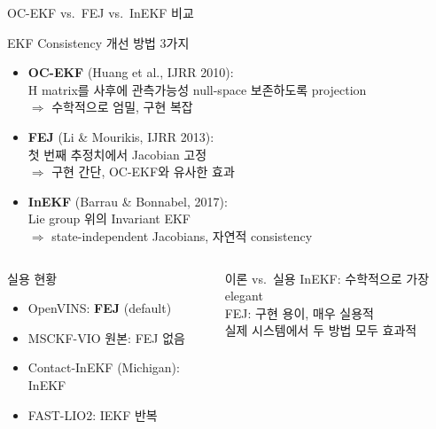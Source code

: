 \begin{frame}[shrink=10]{OC-EKF vs.\ FEJ vs.\ InEKF 비교}
  \begin{block}{EKF Consistency 개선 방법 3가지}
    \begin{itemize}
      \item \textbf{OC-EKF} (Huang et al., IJRR 2010):\\
        H matrix를 사후에 관측가능성 null-space 보존하도록 projection\\
        $\Rightarrow$ 수학적으로 엄밀, 구현 복잡
      \item \textbf{FEJ} (Li \& Mourikis, IJRR 2013):\\
        첫 번째 추정치에서 Jacobian 고정\\
        $\Rightarrow$ 구현 간단, OC-EKF와 유사한 효과
      \item \textbf{InEKF} (Barrau \& Bonnabel, 2017):\\
        Lie group 위의 Invariant EKF\\
        $\Rightarrow$ state-independent Jacobians, 자연적 consistency
    \end{itemize}
  \end{block}
  \begin{columns}[T]
      \begin{exampleblock}{실용 현황}
        \begin{itemize}
          \item OpenVINS: \textbf{FEJ} (default)
          \item MSCKF-VIO 원본: FEJ 없음
          \item Contact-InEKF (Michigan): InEKF
          \item FAST-LIO2: IEKF 반복
        \end{itemize}
      \end{exampleblock}
      \begin{alertblock}{이론 vs.\ 실용}
        InEKF: 수학적으로 가장 elegant\\
        FEJ: 구현 용이, 매우 실용적\\
        실제 시스템에서 두 방법 모두 효과적
      \end{alertblock}
  \end{columns}
\end{frame}


